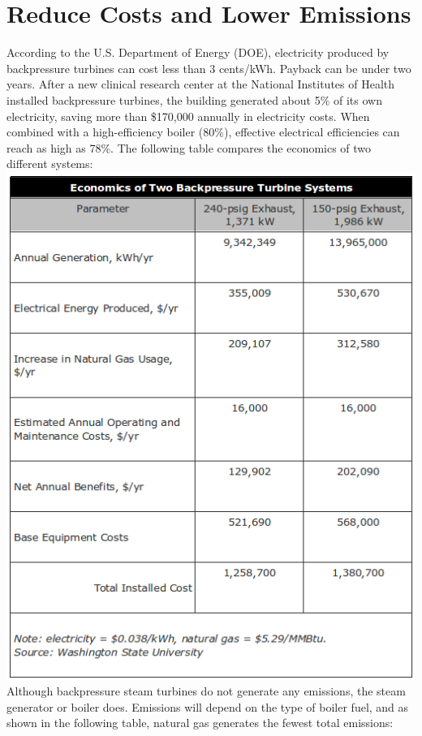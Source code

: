 \documentclass[english,11pt]{report}
\begin{document}
\section{Reduce Costs and Lower Emissions}
According to the U.S. Department of Energy (DOE), electricity produced by backpressure turbines can cost less than 3 cents/kWh. Payback can be under two years. After a new clinical research center at the National Institutes of Health installed backpressure turbines, the building generated about 5\% of its own electricity, saving more than \$170,000 annually in electricity costs. When combined with a high-efficiency boiler (80\%), effective electrical efficiencies can reach as high as 78\%. The following table compares the economics of two different systems:\\[1em]
\includegraphics[width = 6in]{dmt2.png}
\\[1em]
Although backpressure steam turbines do not generate any emissions, the steam generator or boiler does. Emissions will depend on the type of boiler fuel, and as shown in the following table, natural gas generates the fewest total emissions:\\[1em]
\end{document}
